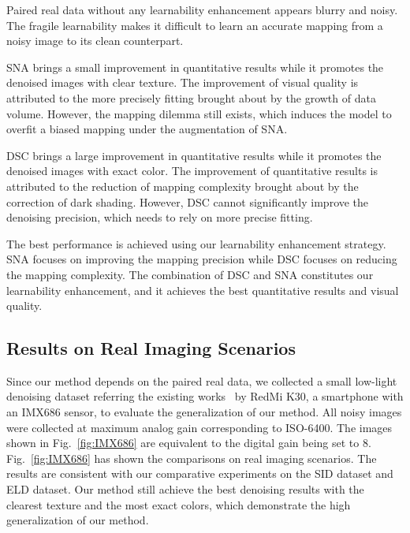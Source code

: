 \documentclass[sigconf,screen,nonacm]{acmart}
\begin{document}
Paired real data without any learnability enhancement appears blurry and noisy. The fragile learnability makes it difficult to learn an accurate mapping from a noisy image to its clean counterpart.


    SNA brings a small improvement in quantitative results while it promotes the denoised images with clear texture.
    The improvement of visual quality is attributed to the more precisely fitting brought about by the growth of data volume.
    However, the mapping dilemma still exists, which induces the model to overfit a biased mapping under the augmentation of SNA.


    DSC brings a large improvement in quantitative results while it promotes the denoised images with exact color.
    The improvement of quantitative results is attributed to the reduction of mapping complexity brought about by the correction of dark shading.
    However, DSC cannot significantly improve the denoising precision, which needs to rely on more precise fitting.
    
The best performance is achieved using our learnability enhancement strategy. SNA focuses on improving the mapping precision while DSC focuses on reducing the mapping complexity. The combination of DSC and SNA constitutes our learnability enhancement, and it achieves the best quantitative results and visual quality.

  \subsection{Results on Real Imaging Scenarios}
Since our method depends on the paired real data, we collected a small low-light denoising dataset referring the existing works~\cite{CVPR17/DND,CVPR18/SID,CVPR18/SIDD,TPAMI21/ELD,ECCV20/Yuzhi} by RedMi K30, a smartphone with an IMX686 sensor, to evaluate the generalization of our method.
All noisy images were collected at maximum analog gain corresponding to ISO-6400. The images shown in Fig.~\ref{fig:IMX686} are equivalent to the digital gain being set to 8.
    Fig.~\ref{fig:IMX686} has shown the comparisons on real imaging scenarios.
The results are consistent with our comparative experiments on the SID dataset and ELD dataset. Our method still achieve the best denoising results with the clearest texture and the most exact colors, which demonstrate the high generalization of our method.
\end{document}
